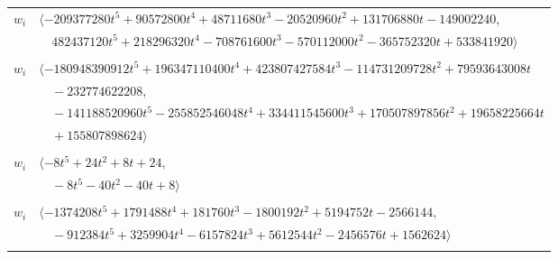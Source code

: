 \documentclass[11pt]{article}
\begin{document}
\begin{longtable}{@{}ll@{}}
$w_i$ & $\langle -209377280t^{5}+90572800t^{4}+48711680t^{3}-20520960t^{2}+131706880t-149002240,$\\
 & $\quad 482437120t^{5}+218296320t^{4}-708761600t^{3}-570112000t^{2}-365752320t+533841920\rangle$\\
\addlinespace[2pt]
\multicolumn{2}{@{}p{0.97\textwidth}@{}}{$i=32$, $D_i=839808$, $\rho_{ij}$: $3{:}1, \allowbreak 6{:}3, \allowbreak 7{:}2, \allowbreak 8{:}1, \allowbreak 9{:}3, \allowbreak 21{:}1, \allowbreak 25{:}1, \allowbreak 28{:}3, \allowbreak 29{:}2, \allowbreak 38{:}2, \allowbreak 44{:}2, \allowbreak 49{:}3, \allowbreak 50{:}1, \allowbreak 62{:}2, \allowbreak 65{:}1, \allowbreak 68{:}2, \allowbreak 73{:}3, \allowbreak 75{:}1, \allowbreak 78{:}1, \allowbreak 80{:}3$}\\
$w_i$ & $\langle -180948390912t^{5}+196347110400t^{4}+423807427584t^{3}-114731209728t^{2}+79593643008t$\\
 & $\quad -232774622208,$\\
 & $\quad -141188520960t^{5}-255852546048t^{4}+334411545600t^{3}+170507897856t^{2}+19658225664t$\\
 & $\quad +155807898624\rangle$\\
\addlinespace[2pt]
\multicolumn{2}{@{}p{0.97\textwidth}@{}}{$i=33$, $D_i=4$, $\rho_{ij}$: $2{:}2, \allowbreak 6{:}2, \allowbreak 30{:}2, \allowbreak 36{:}2, \allowbreak 53{:}2, \allowbreak 64{:}2, \allowbreak 66{:}2, \allowbreak 69{:}2$}\\
$w_i$ & $\langle -8t^{5}+24t^{2}+8t+24,$\\
 & $\quad -8t^{5}-40t^{2}-40t+8\rangle$\\
\addlinespace[2pt]
\multicolumn{2}{@{}p{0.97\textwidth}@{}}{$i=34$, $D_i=256$, $\rho_{ij}$: $2{:}2, \allowbreak 3{:}3, \allowbreak 12{:}2, \allowbreak 15{:}3, \allowbreak 18{:}3, \allowbreak 24{:}1, \allowbreak 26{:}2, \allowbreak 38{:}1, \allowbreak 42{:}1, \allowbreak 44{:}1, \allowbreak 48{:}1, \allowbreak 51{:}2, \allowbreak 53{:}2, \allowbreak 55{:}1, \allowbreak 56{:}2, \allowbreak 60{:}1, \allowbreak 62{:}1, \allowbreak 64{:}1, \allowbreak 77{:}2, \allowbreak 78{:}3, \allowbreak 81{:}2$}\\
$w_i$ & $\langle -1374208t^{5}+1791488t^{4}+181760t^{3}-1800192t^{2}+5194752t-2566144,$\\
 & $\quad -912384t^{5}+3259904t^{4}-6157824t^{3}+5612544t^{2}-2456576t+1562624\rangle$\\
\addlinespace[2pt]
\multicolumn{2}{@{}p{0.97\textwidth}@{}}{$i=35$, $D_i=512$, $\rho_{ij}$: $1{:}3, \allowbreak 2{:}2, \allowbreak 4{:}2, \allowbreak 5{:}1, \allowbreak 6{:}2, \allowbreak 7{:}1, \allowbreak 9{:}3, \allowbreak 12{:}2, \allowbreak 14{:}1, \allowbreak 18{:}1, \allowbreak 20{:}1, \allowbreak 22{:}2, \allowbreak 25{:}1, \allowbreak 26{:}1, \allowbreak 37{:}2, \allowbreak 44{:}2, \allowbreak 45{:}3, \allowbreak 46{:}1, \allowbreak 48{:}1, \allowbreak 53{:}2, \allowbreak 60{:}3, \allowbreak 62{:}2, \allowbreak 64{:}2, \allowbreak 70{:}3, \allowbreak 77{:}3, \allowbreak 79{:}2$}\\

\end{longtable}
\end{document}
